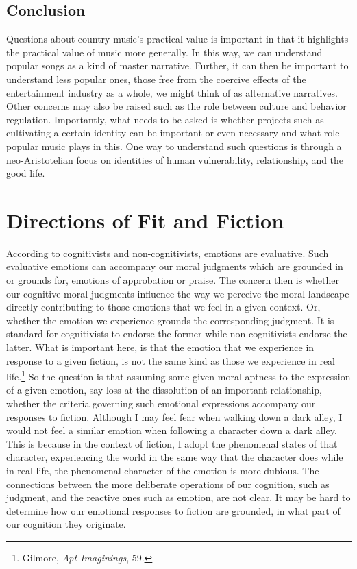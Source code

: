 \documentclass[phdthesis,12pt,final]{wuthesis}
\theoremstyle{definition}
\theoremstyle{definition}
\theoremstyle{definition}
\theoremstyle{definition}
\theoremstyle{remark}
\begin{document}
\section{Conclusion}\label{conclusion}

Questions about country music's practical value is important in that it highlights the practical value of music more generally. In this way, we can understand popular songs as a kind of master narrative. Further, it can then be important to understand less popular ones, those free from the coercive effects of the entertainment industry as a whole, we might think of as alternative narratives. Other concerns may also be raised such as the role between culture and behavior regulation. Importantly, what needs to be asked is whether projects such as cultivating a certain identity can be important or even necessary and what role popular music plays in this. One way to understand such questions is through a neo-Aristotelian focus on identities of human vulnerability, relationship, and the good life.

\chapter{Directions of Fit and Fiction}\label{directions-of-fit-and-fiction}

According to cognitivists and non-cognitivists, emotions are evaluative. Such evaluative emotions can accompany our moral judgments which are grounded in or grounds for, emotions of approbation or praise. The concern then is whether our cognitive moral judgments influence the way we perceive the moral landscape directly contributing to those emotions that we feel in a given context. Or, whether the emotion we experience grounds the corresponding judgment. It is standard for cognitivists to endorse the former while non-cognitivists endorse the latter. What is important here, is that the emotion that we experience in response to a given fiction, is not the same kind as those we experience in real life.\footnote{Gilmore, \emph{Apt {Imaginings}}, 59.} So the question is that assuming some given moral aptness to the expression of a given emotion, say loss at the dissolution of an important relationship, whether the criteria governing such emotional expressions accompany our responses to fiction. Although I may feel fear when walking down a dark alley, I would not feel a similar emotion when following a character down a dark alley. This is because in the context of fiction, I adopt the phenomenal states of that character, experiencing the world in the same way that the character does while in real life, the phenomenal character of the emotion is more dubious. The connections between the more deliberate operations of our cognition, such as judgment, and the reactive ones such as emotion, are not clear. It may be hard to determine how our emotional responses to fiction are grounded, in what part of our cognition they originate.
\end{document}
